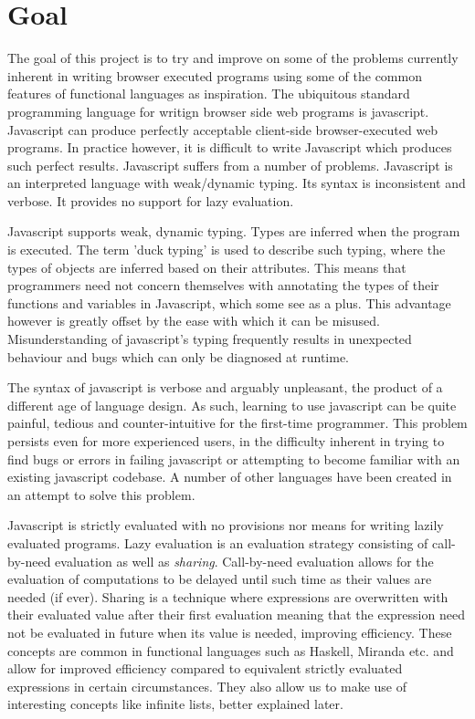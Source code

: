 
\section{Goal}
The goal of this project is to try and improve on some of the problems currently 
inherent in writing browser executed programs using some of the common features
of functional languages as inspiration. The ubiquitous standard programming 
language for writign browser side web programs is javascript. Javascript can produce 
perfectly acceptable client-side browser-executed
web programs. In practice however, it is difficult to write Javascript which produces 
such perfect results. Javascript suffers from a number of problems. Javascript is an
interpreted language with weak/dynamic typing. Its syntax is inconsistent and verbose.
It provides no support for lazy evaluation.


Javascript supports weak, dynamic typing. Types are inferred when the program is
executed. The term 'duck typing' is used to describe such typing, where the types
of objects are inferred based on their attributes. This means that programmers need
not concern themselves with annotating the types of their functions and variables in
Javascript, which some see as a plus. This advantage however is greatly offset by
the ease with which it can be misused. Misunderstanding of javascript's typing 
frequently results in unexpected behaviour and bugs which can only be diagnosed at
runtime. 

The syntax of javascript is verbose and arguably unpleasant, the product of a different
age of language design. As such, learning to use javascript can be quite painful, tedious
and counter-intuitive for the first-time programmer. This problem persists even for
more experienced users, in the difficulty inherent in trying to find bugs or errors in
failing javascript or attempting to become familiar with an existing javascript codebase.
A number of other languages have been created in an attempt to solve this problem.

Javascript is strictly evaluated with no provisions nor means for writing lazily evaluated
programs. Lazy evaluation is an evaluation strategy consisting of call-by-need evaluation
as well as \emph{sharing}. Call-by-need evaluation allows for the evaluation of
computations to be delayed until such time as their values are needed (if ever). Sharing
is a technique where expressions are overwritten with their evaluated value after their
first evaluation meaning that the expression need not be evaluated in future when its
value is needed, improving efficiency. These concepts are common in functional languages
such as Haskell, Miranda etc. and allow for improved efficiency compared to equivalent
strictly evaluated expressions in certain circumstances. They also allow us to make use
of interesting concepts like infinite lists, better explained later.

